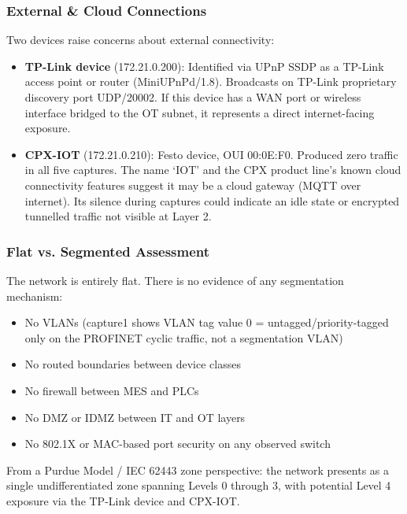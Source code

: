 \subsubsection{External \& Cloud Connections}

Two devices raise concerns about external connectivity:

\begin{itemize}
\item \textbf{TP-Link device} (172.21.0.200): Identified via UPnP SSDP as a TP-Link access point or router (MiniUPnPd/1.8). Broadcasts on TP-Link proprietary discovery port UDP/20002. If this device has a WAN port or wireless interface bridged to the OT subnet, it represents a direct internet-facing exposure.
\item \textbf{CPX-IOT} (172.21.0.210): Festo device, OUI 00:0E:F0. Produced zero traffic in all five captures. The name `IOT' and the CPX product line's known cloud connectivity features suggest it may be a cloud gateway (MQTT over internet). Its silence during captures could indicate an idle state or encrypted tunnelled traffic not visible at Layer 2.
\end{itemize}

\subsubsection{Flat vs. Segmented Assessment}

The network is entirely flat. There is no evidence of any segmentation mechanism:

\begin{itemize}
\item No VLANs (capture1 shows VLAN tag value 0 = untagged/priority-tagged only on the PROFINET cyclic traffic, not a segmentation VLAN)
\item No routed boundaries between device classes
\item No firewall between MES and PLCs
\item No DMZ or IDMZ between IT and OT layers
\item No 802.1X or MAC-based port security on any observed switch
\end{itemize}

From a Purdue Model / IEC 62443 zone perspective: the network presents as a single undifferentiated zone spanning Levels 0 through 3, with potential Level 4 exposure via the TP-Link device and CPX-IOT.
